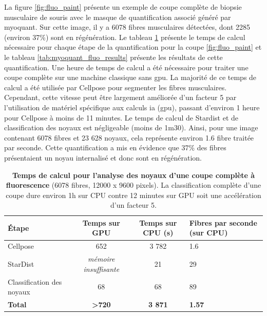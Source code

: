 La figure \ref{fig:fluo_paint} présente un exemple de coupe complète de biopsie musculaire de souris avec le masque de quantification associé généré par \gls{myoquant}. Sur cette image, il y a 6078 fibres musculaires détectées, dont 2285 (environ 37\%) sont en régénération. Le tableau \ref{tab:myoquant_fluo_time} présente le temps de calcul nécessaire pour chaque étape de la quantification pour la coupe \ref{fig:fluo_paint} et le tableau \ref{tab:myoquant_fluo_results} présente les résultats de cette quantification. Une heure de temps de calcul a été nécessaire pour traiter une coupe complète sur une machine classique sans \gls{gpu}. La majorité de ce temps de calcul a été utilisée par Cellpose pour segmenter les fibres musculaires. Cependant, cette vitesse peut être largement améliorée d'un facteur 5 par l'utilisation de matériel spécifique aux calculs \gls{ia} (\gls{gpu}), passant d’environ 1 heure pour Cellpose à moins de 11 minutes. Le temps de calcul de Stardist et de classification des noyaux est négligeable (moins de 1m30). Ainsi, pour une image contenant 6078 fibres et 23 628 noyaux, cela représente environ 1.6 fibre traitée par seconde. Cette quantification a mis en évidence que 37\% des fibres présentaient un noyau internalisé et donc sont en régénération.
\begin{table}[!ht]
\centering
\caption[Temps de calcul pour l'analyse des noyaux d'une coupe complète à fluorescence]{\textbf{Temps de calcul pour l'analyse des noyaux d'une coupe complète à fluorescence} (6078 fibres, 12000 x 9600 pixels). La classification complète d'une coupe dure environ 1h sur CPU contre 12 minutes sur GPU soit une accélération d'un facteur 5.}
\label{tab:myoquant_fluo_time}
\begin{tabularx}{\textwidth}{|l|c|c|X|}
\hline
\textbf{Étape} & \textbf{Temps sur GPU} & \textbf{Temps sur CPU (s)} & \textbf{Fibres par seconde (sur CPU)} \\
\hline
Cellpose & 652 & 3 782 & 1.6 \\
\hline
StarDist & \textit{mémoire insuffisante} & 21 & 29 \\
\hline
Classification des noyaux & 68 & 68 & 89 \\
\hline
\textbf{Total} & \textbf{>720} & \textbf{3 871} & \textbf{1.57} \\
\hline
\end{tabularx}
\end{table}

